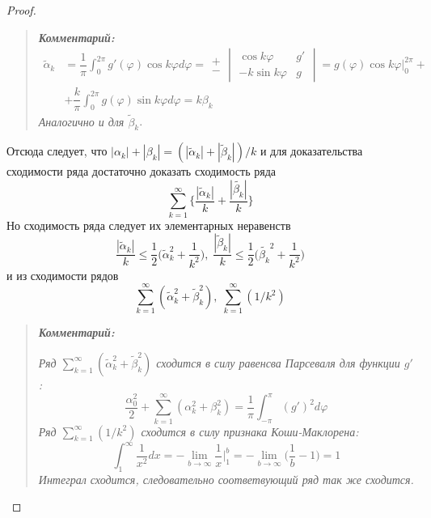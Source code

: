 \documentclass[14pt, a4paper]{extarticle}
\begin{document}
\begin{proof}
	  			\begin{framed}
	  				\begin{quote}
  				\textit{\textbf{Комментарий:}}
	  			\begin{align*} 
	  				\widetilde{\alpha}_k &= \dfrac{1}{\pi} \int_{0}^{2\pi} g'(\varphi) \cos{k \varphi} d\varphi =  \begin{matrix} + \\ - \end{matrix} \begin{vmatrix} \cos{k\varphi} & g' \\ -k\sin{k\varphi} & g \end{vmatrix} = g(\varphi) \cos{k\varphi} \Big|_0^{2\pi} + \\ &+ \dfrac{k}{\pi} \int_{0}^{2\pi}g(\varphi) \sin{k\varphi} d\varphi  = k \beta_k 
	  			\end{align*}
	  			\textit{Аналогично и для $\widetilde{\beta}_k$}.\\
	  				\end{quote}
	  			\end{framed}
	  			Отсюда следует, что $| \alpha_k | + | \beta_k | = (| \widetilde{\alpha}_k | + | \widetilde{\beta}_k | )/k $ и для доказательства сходимости ряда достаточно доказать сходимость ряда
	  			\begin{equation}
	  				\sum_{k=1}^{\infty} \Bigg\{ \dfrac{ | \widetilde{\alpha}_k | }{k}  +  \dfrac{| \widetilde{\beta_k} | }{k} \Bigg\} \label{30}
  				\end{equation}
  				Но сходимость ряда следует их элементарных неравенств
  				\begin{equation*}
  					\dfrac{| \widetilde{\alpha}_k|}{k} \leq \dfrac{1}{2} \bigg(  \widetilde{\alpha}_k^2 + \dfrac{1}{k^2} \bigg), \; 	\dfrac{| \widetilde{\beta}_k|}{k} \leq \dfrac{1}{2} \bigg(  \widetilde{\beta_k}^2 + \dfrac{1}{k^2} \bigg)
				\end{equation*}
				и из сходимости рядов
  				\begin{equation*}
					\sum_{k=1}^{\infty} ( \widetilde{\alpha}^2_k + \widetilde{\beta}^2_k ), \; \sum_{k=1}^{\infty} (1/k^2)
				\end{equation*}
				
				\begin{framed}
					\begin{quote}
  				\textit{\textbf{Комментарий:}}
				
				\textit{Ряд $ \sum_{k=1}^{\infty} ( \widetilde{\alpha}^2_k + \widetilde{\beta}^2_k ) $ сходится в силу равенсва Парсеваля для функции $g'$:}
				\[ \dfrac{\alpha^2_0}{2} + \sum_{k=1}^{\infty} ( \alpha^2_k + \beta^2_k ) = \dfrac{1}{\pi} \int_{-\pi}^{\pi} (g')^2 d\varphi \]
				\textit{Ряд $ \sum_{k=1}^{\infty} (1/k^2) $ сходится в силу признака Коши-Маклорена:}
				\[ \int_{1}^{\infty} \dfrac{1}{x^2} dx = - \lim_{b \rightarrow \infty} \dfrac{1}{x} \Big|^b_1 = - \lim_{b \rightarrow \infty} \bigg( \dfrac{1}{b} - 1 \bigg) = 1 \]
				\textit{Интеграл сходится, следовательно соответвующий ряд так же сходится.}
					\end{quote}
	  			\end{framed}
	  			\end{proof}
\end{document}
